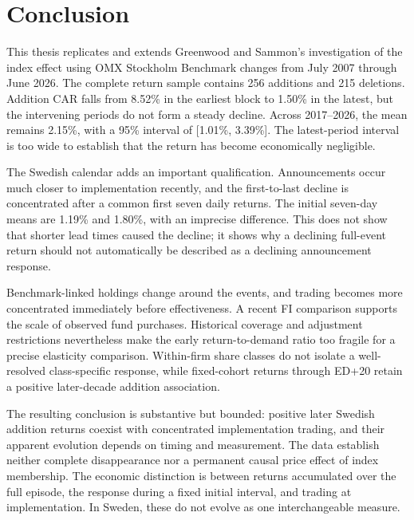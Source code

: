 \section{Conclusion}\label{sec:conclusion}

This thesis replicates and extends Greenwood and Sammon's investigation of the index effect using OMX Stockholm Benchmark changes from July 2007 through June 2026. The complete return sample contains 256 additions and 215 deletions. Addition CAR falls from 8.52\% in the earliest block to 1.50\% in the latest, but the intervening periods do not form a steady decline. Across 2017--2026, the mean remains 2.15\%, with a 95\% interval of [1.01\%, 3.39\%]. The latest-period interval is too wide to establish that the return has become economically negligible.

The Swedish calendar adds an important qualification. Announcements occur much closer to implementation recently, and the first-to-last decline is concentrated after a common first seven daily returns. The initial seven-day means are 1.19\% and 1.80\%, with an imprecise difference. This does not show that shorter lead times caused the decline; it shows why a declining full-event return should not automatically be described as a declining announcement response.

Benchmark-linked holdings change around the events, and trading becomes more concentrated immediately before effectiveness. A recent FI comparison supports the scale of observed fund purchases. Historical coverage and adjustment restrictions nevertheless make the early return-to-demand ratio too fragile for a precise elasticity comparison. Within-firm share classes do not isolate a well-resolved class-specific response, while fixed-cohort returns through ED+20 retain a positive later-decade addition association.

The resulting conclusion is substantive but bounded: positive later Swedish addition returns coexist with concentrated implementation trading, and their apparent evolution depends on timing and measurement. The data establish neither complete disappearance nor a permanent causal price effect of index membership. The economic distinction is between returns accumulated over the full episode, the response during a fixed initial interval, and trading at implementation. In Sweden, these do not evolve as one interchangeable measure.
